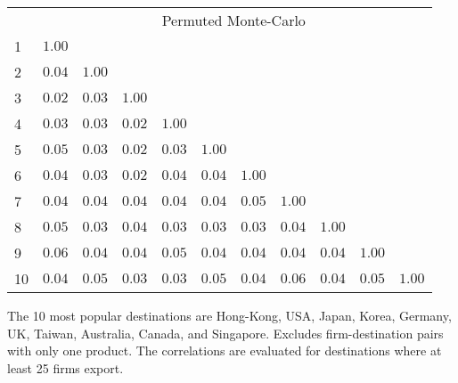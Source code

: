 \documentclass{article}
\begin{document}
\begin{table}[h]
{\begin{threeparttable}
\begin{tabular}{lrrrrrrrrrr}
& \multicolumn{10}{c}{Permuted Monte-Carlo}\\ 
\cmidrule{2-11} 
1  & $1.00$    &              &             &             &              &            &               &            &              &                        \\  
2  & $0.04$    & $1.00$     &             &             &              &            &               &            &              &                        \\  
3  & $0.02$    & $0.03$     & $1.00$    &             &              &            &               &            &              &                        \\  
4  & $0.03$    & $0.03$     & $0.02$    &  $1.00$   &              &            &               &            &              &                        \\  
5  & $0.05$    & $0.03$     & $0.02$    &  $0.03$   & $1.00$     &            &               &            &              &                        \\  
6  & $0.04$    & $0.03$     & $0.02$    &  $0.04$   & $0.04$     &  $1.00$  &               &            &              &                        \\  
7  & $0.04$    & $0.04$     & $0.04$    &  $0.04$   & $0.04$     &  $0.05$  &  $1.00$     &            &              &                        \\  
8  & $0.05$    & $0.03$     & $0.04$    &  $0.03$   & $0.03$     &  $0.03$  &  $0.04$     & $1.00$   &              &                        \\  
9  & $0.06$    & $0.04$     & $0.04$    &  $0.05$   & $0.04$     &  $0.04$  &  $0.04$     & $0.04$   & $1.00$     &                        \\  
10 & $0.04$   & $0.05$    & $0.03$   &  $0.03$  & $0.05$    &  $0.04$ &  $0.06$    & $0.04$  & $0.05$    &   $1.00$           \\  
\hline
\hline
\end{tabular}
\begin{tablenotes}
\small
\item  \noindent  \footnotesize{The 10 most popular destinations are Hong-Kong, USA, Japan, Korea, Germany, UK, Taiwan, Australia, Canada, and Singapore. Excludes firm-destination pairs with only one product. The correlations are evaluated for destinations where at least 25 firms export.}
\end{tablenotes}
\end{threeparttable}
}
\end{table}
\end{document}
